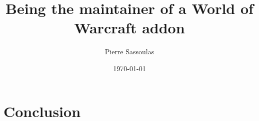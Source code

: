 \documentclass{beamer}
\begin{document}
\title{Being the maintainer of a World of Warcraft addon}
\author{Pierre Sassoulas}
\date{\today}

\frame{\titlepage}

\section{Conclusion}

\end{document}

